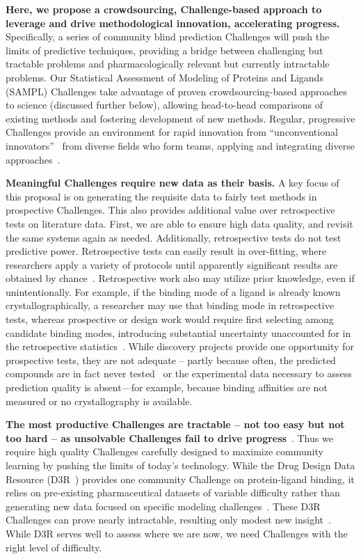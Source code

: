 \documentclass[11pt]{article}
\begin{document}
{\bf Here, we propose a crowdsourcing, Challenge-based approach to leverage and drive methodological innovation, accelerating progress.} 
Specifically, a series of community blind prediction Challenges will push the limits of predictive techniques, providing a bridge between challenging but tractable problems and pharmacologically relevant but currently intractable problems.
Our Statistical Assessment of Modeling of Proteins and Ligands (SAMPL) Challenges take advantage of proven crowdsourcing-based approaches to science (discussed further below), allowing head-to-head comparisons of existing methods and fostering development of new methods.
Regular, progressive Challenges provide an environment for rapid innovation from ``unconventional innovators''~\cite{Kay:2011:R&DManage} from diverse fields who form teams, applying and integrating diverse approaches~\cite{Saez-Rodriguez:2016:NatRevGenet}.

{\bf Meaningful Challenges require new data as their basis.}
A key focus of this proposal is on generating the requisite data to fairly test methods in prospective Challenges. 
This also provides additional value over retrospective tests on literature data.
First, we are able to ensure high data quality, and revisit the same systems again as needed.
Additionally, retrospective tests do not test predictive power. 
Retrospective tests can easily result in over-fitting, where researchers apply a variety of protocols until apparently significant results are obtained by chance~\cite{Nuzzo:2015:Nature}.
Retrospective work also may utilize prior knowledge, even if unintentionally.  
For example, if the binding mode of a ligand is already known crystallographically, a researcher may use that binding mode in retrospective tests, whereas prospective or design work would require first selecting among candidate binding modes, introducing substantial uncertainty unaccounted for in the retrospective statistics~\cite{mobley_predicting_2007, boyce_predicting_2009, mobley_perspective_2012}.
While discovery projects provide one opportunity for prospective tests, they are not adequate -- partly because often, the predicted compounds are in fact never tested~\cite{christ_binding_2016} or the experimental data necessary to assess prediction quality is absent---for example, because binding affinities are not measured or no crystallography is available.

{\bf The most productive Challenges are tractable -- not too easy but not too hard -- as unsolvable Challenges fail to drive progress}~\cite{Saez-Rodriguez:2016:NatRevGenet}. 
Thus we require high quality Challenges carefully designed to maximize community learning by pushing the limits of today's technology.
While the Drug Design Data Resource (D3R~\cite{Gathiaka:2016:JComputAidedMolDes}) provides one community Challenge on protein-ligand binding, it relies on pre-existing pharmaceutical datasets of variable difficulty rather than generating new data focused on specific modeling challenges~\cite{Gathiaka:2016:JComputAidedMolDes}. 
These D3R Challenges can prove nearly intractable, resulting only modest new insight~\cite{D3R_lessons_learned}.
While D3R serves well to assess where we are now, we need Challenges with the right level of difficulty.
\end{document}
